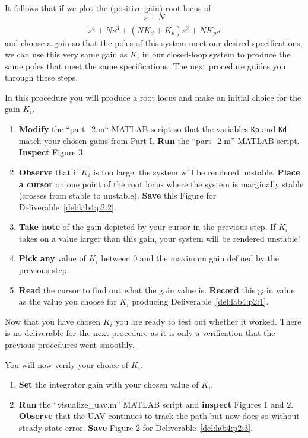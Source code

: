 It follows that if we plot the (positive gain) root locus of
\[
  \frac{s + N}{s^4 + N s^3 + (N K_d + K_p)s^2 + N K_p s}
\]
and choose a gain so that the poles of this system meet our desired specifications, we can use this very same gain as \(K_i\) in our closed-loop system to produce the same poles that meet the same specifications.
The next procedure guides you through these steps.
%
\begin{procedure}[label={proc:lab4:ki}]
  In this procedure you will produce a root locus and make an initial choice for the gain \(K_i.\)
  \begin{enumerate}[label={(\arabic*)}]
    \item{%
      \textbf{Modify} the ``part\_2.m`` MATLAB script so that the variables \texttt{Kp} and \texttt{Kd} match your chosen gains from Part I.
      \textbf{Run} the ``part\_2.m'' MATLAB script.
      \textbf{Inspect} Figure 3.
    }
    \item{%
      \textbf{Observe} that if \(K_i\) is too large, the system will be rendered unstable. \textbf{Place a cursor} on one point of the root locus where the system is marginally stable (crosses from stable to unstable).
      \textbf{Save} this Figure for Deliverable~\ref{del:lab4:p2:2}.
    }
    \item{%
      \textbf{Take note} of the gain depicted by your cursor in the previous step.
      If \(K_i\) takes on a value larger than this gain, your system will be rendered unstable!
    }
    \item{%
      \textbf{Pick any} value of \(K_i\) between \(0\) and the maximum gain defined by the previous step.
    }
    \item{%
      \textbf{Read} the cursor to find out what the gain value is.
      \textbf{Record} this gain value as the value you choose for \(K_i\) producing Deliverable~\ref{del:lab4:p2:1}.
    }
  \end{enumerate}
\end{procedure}
%
Now that you have chosen \(K_i\) you are ready to test out whether it worked.
There is no deliverable for the next procedure as it is only a verification that the previous procedures went smoothly.
%
\begin{procedure}[label={proc:lab4:verify}]
  You will now verify your choice of \(K_i.\)
  \begin{enumerate}[label={(\arabic*)}]
    \item{%
      \textbf{Set} the integrator gain with your chosen value of \(K_i.\)
    }
    \item{%
      \textbf{Run} the ``visualize\_uav.m'' MATLAB script and \textbf{inspect} Figures 1 and 2.
      \textbf{Observe} that the UAV continues to track the path but now does so without steady-state error.
      \textbf{Save} Figure 2 for Deliverable~\ref{del:lab4:p2:3}.
    }
  \end{enumerate}
\end{procedure}

